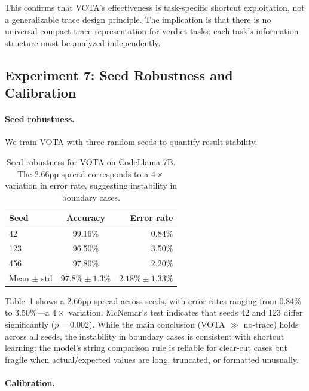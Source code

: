 \documentclass[11pt,a4paper]{article}
\begin{document}
This confirms that VOTA's effectiveness is task-specific shortcut exploitation, not a generalizable trace design principle. The implication is that there is no universal compact trace representation for verdict tasks: each task's information structure must be analyzed independently.

\subsection{Experiment 7: Seed Robustness and Calibration}
\label{sec:exp7}

\paragraph{Seed robustness.} We train VOTA with three random seeds to quantify result stability.

\begin{table}[t]
\centering
\small
\begin{tabular}{lcr}
\toprule
\textbf{Seed} & \textbf{Accuracy} & \textbf{Error rate} \\
\midrule
42 & 99.16\% & 0.84\% \\
123 & 96.50\% & 3.50\% \\
456 & 97.80\% & 2.20\% \\
\midrule
Mean $\pm$ std & $97.8\% \pm 1.3\%$ & $2.18\% \pm 1.33\%$ \\
\bottomrule
\end{tabular}
\caption{Seed robustness for VOTA on CodeLlama-7B. The 2.66pp spread corresponds to a $4\times$ variation in error rate, suggesting instability in boundary cases.}
\label{tab:seed_robustness}
\end{table}

Table~\ref{tab:seed_robustness} shows a 2.66pp spread across seeds, with error rates ranging from 0.84\% to 3.50\%---a $4\times$ variation. McNemar's test indicates that seeds 42 and 123 differ significantly ($p = 0.002$). While the main conclusion (VOTA $\gg$ no-trace) holds across all seeds, the instability in boundary cases is consistent with shortcut learning: the model's string comparison rule is reliable for clear-cut cases but fragile when actual/expected values are long, truncated, or formatted unusually.

\paragraph{Calibration.}
\end{document}
